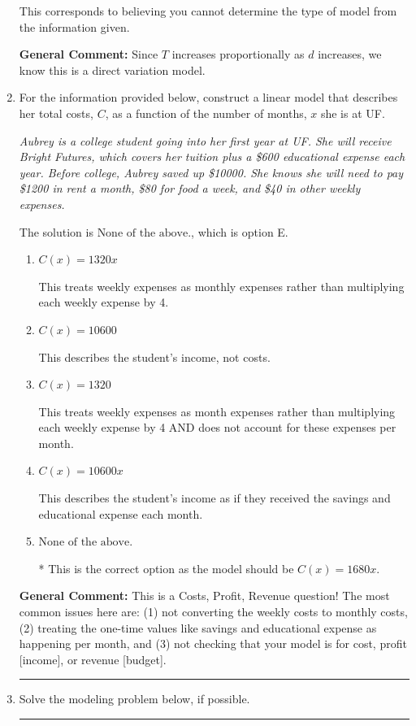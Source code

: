 \documentclass{extbook}[14pt]
\newcommand{\litem}[1]{\item #1

\rule{\textwidth}{0.4pt}}
\begin{document}
\begin{enumerate}
{\begin{enumerate}[label=\Alph*.]
This corresponds to believing you cannot determine the type of model from the information given.
\end{enumerate}

\textbf{General Comment:} Since $T$ increases proportionally as $d$ increases, we know this is a direct variation model.
}
\litem{
For the information provided below, construct a linear model that describes her total costs, $C$, as a function of the number of months, $x$ she is at UF. 

\begin{center}
    \textit{ Aubrey is a college student going into her first year at UF. She will receive Bright Futures, which covers her tuition plus a \$600 educational expense each year. Before college, Aubrey saved up \$10000. She knows she will need to pay \$1200 in rent a month, \$80 for food a week, and \$40 in other weekly expenses. }
\end{center}
The solution is \( \text{None of the above.} \), which is option E.\begin{enumerate}[label=\Alph*.]
\item \( C(x) = 1320 x \)

This treats weekly expenses as monthly expenses rather than multiplying each weekly expense by 4.
\item \( C(x) = 10600 \)

This describes the student's income, not costs.
\item \( C(x) = 1320 \)

This treats weekly expenses as month expenses rather than multiplying each weekly expense by 4 AND does not account for these expenses per month.
\item \( C(x) = 10600 x \)

This describes the student's income as if they received the savings and educational expense each month.
\item \( \text{None of the above.} \)

* This is the correct option as the model should be $C(x) = 1680 x$.
\end{enumerate}

\textbf{General Comment:} This is a Costs, Profit, Revenue question! The most common issues here are: (1) not converting the weekly costs to monthly costs, (2) treating the one-time values like savings and educational expense as happening per month, and (3) not checking that your model is for cost, profit [income], or revenue [budget].
}
\litem{
Solve the modeling problem below, if possible.

}
\end{enumerate}
\end{document}
